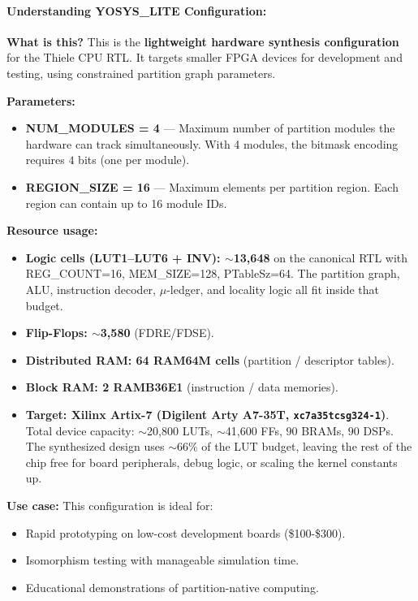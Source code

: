 \paragraph{Understanding YOSYS\_LITE Configuration:}

\textbf{What is this?} This is the \textbf{lightweight hardware synthesis configuration} for the Thiele CPU RTL. It targets smaller FPGA devices for development and testing, using constrained partition graph parameters.

\textbf{Parameters:}
\begin{itemize}
    \item \textbf{NUM\_MODULES = 4} — Maximum number of partition modules the hardware can track simultaneously. With 4 modules, the bitmask encoding requires $4$ bits (one per module).
    \item \textbf{REGION\_SIZE = 16} — Maximum elements per partition region. Each region can contain up to 16 module IDs.
\end{itemize}

\textbf{Resource usage:}
\begin{itemize}
    \item \textbf{Logic cells (LUT1--LUT6 + INV): $\sim$13{,}648} on the
          canonical RTL with REG\_COUNT=16, MEM\_SIZE=128, PTableSz=64.
          The partition graph, ALU, instruction decoder, $\mu$-ledger,
          and locality logic all fit inside that budget.
    \item \textbf{Flip-Flops: $\sim$3{,}580} (FDRE/FDSE).
    \item \textbf{Distributed RAM: 64 RAM64M cells} (partition / descriptor tables).
    \item \textbf{Block RAM: 2 RAMB36E1} (instruction / data memories).
    \item \textbf{Target: Xilinx Artix-7 (Digilent Arty A7-35T,
          \texttt{xc7a35tcsg324-1})}. Total device capacity:
          $\sim$20{,}800 LUTs, $\sim$41{,}600 FFs, $90$ BRAMs, $90$ DSPs.
          The synthesized design uses $\sim 66\%$ of the LUT budget,
          leaving the rest of the chip free for board peripherals,
          debug logic, or scaling the kernel constants up.
\end{itemize}

\textbf{Use case:} This configuration is ideal for:
\begin{itemize}
    \item Rapid prototyping on low-cost development boards (\$100-\$300).
    \item Isomorphism testing with manageable simulation time.
    \item Educational demonstrations of partition-native computing.
\end{itemize}

